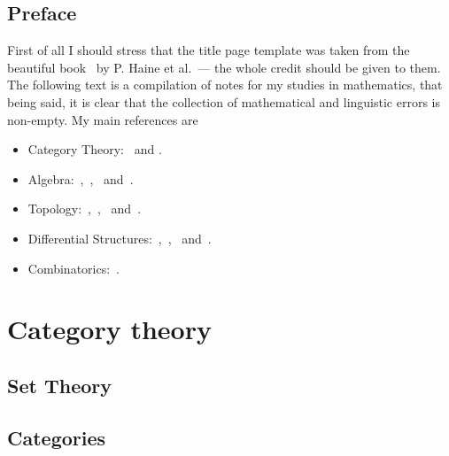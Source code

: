 


\frontmatter

% 
\maketitle

\tableofcontents
\listoftodos

\pagestyle{plain}

\chapter{Preface}

First of all I should stress that the title page template was taken from the
beautiful book~\cite{Haine21DiffCoho} by P. Haine et al.~--- the whole credit
should be given to them. The following text is a compilation of notes for my
studies in mathematics, that being said, it is clear that the collection of
mathematical and linguistic errors is non-empty. My main references are
\begin{itemize}\setlength\itemsep{0em}
\item Category Theory:~\cite{Rie16} and \cite{Shap06}.
\item Algebra:~\cite{Yu89},~\cite{Kim20},~\cite{Aluf09} and~\cite{Lang93}.
\item Topology:~\cite{Lee11},~\cite{Tai20},~\cite{Mun00} and~\cite{Eng89}.
\item Differential Structures:~\cite{Zor15},~\cite{Zor16},~\cite{Rud76}
  and~\cite{Jost06}.
\item Combinatorics:~\cite{Die16}.
\end{itemize}

\mainmatter

\part{Category theory}

\chapter{Set Theory}



\chapter{Categories}





